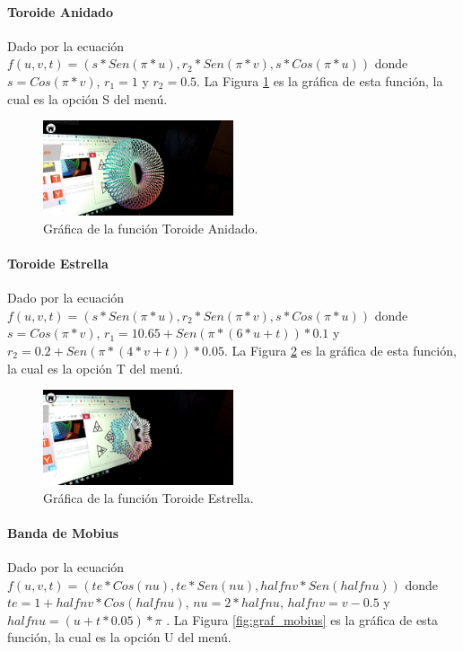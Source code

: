 \paragraph{Toroide Anidado}
Dado por la ecuación $f(u,v,t)=(s*Sen(\pi * u), r_2 * Sen(\pi *  v), s*Cos(\pi * u))$ donde $s = Cos(\pi * v)$, $r_1 = 1$ y $r_2 = 0.5$. La Figura \ref{fig:graf_toroide_anidado} es la gráfica de esta función, la cual es la opción S del menú.

\begin{figure}[hbt!]
\centering
\includegraphics[width=0.5\textwidth]{figuras/graficas/toroide_anidado.png}
\caption{\label{fig:graf_toroide_anidado}Gráfica de la función Toroide Anidado.}
\end{figure}
\FloatBarrier

\paragraph{Toroide Estrella}
Dado por la ecuación $f(u,v,t)=(s*Sen(\pi * u), r_2 * Sen(\pi *  v), s*Cos(\pi * u))$ donde $s = Cos(\pi * v)$, $r_1 = 10.65 + Sen(\pi * (6 * u + t)) * 0.1$ y $r_2 = 0.2 + Sen(\pi * (4 * v + t)) * 0.05$. La Figura \ref{fig:graf_toroide_estrella} es la gráfica de esta función, la cual es la opción T del menú.

\begin{figure}[hbt!]
\centering
\includegraphics[width=0.5\textwidth]{figuras/graficas/toroide_estrella.png}
\caption{\label{fig:graf_toroide_estrella}Gráfica de la función Toroide Estrella.}
\end{figure}
\FloatBarrier

\paragraph{Banda de Mobius}
Dado por la ecuación $f(u,v,t)=(te*Cos(nu),te*Sen(nu),halfnv*Sen(halfnu))$ donde $te = 1 + halfnv * Cos(halfnu)$, $nu = 2 * halfnu$, $halfnv = v - 0.5$ y $halfnu = (u + t * 0.05) * \pi$ . La Figura \ref{fig:graf_mobius} es la gráfica de esta función, la cual es la opción U del menú.

